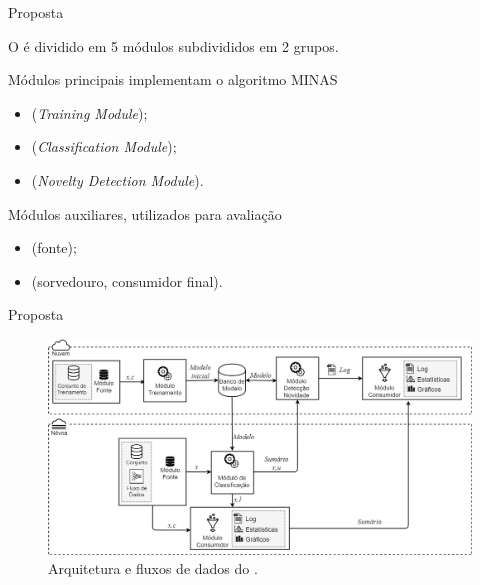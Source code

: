 \documentclass[aspectratio=43,10pt]{beamer}
\newcommand{\nota}[1]{\hspace*{-0.5cm}\textit{{\color[rgb]{1,0,0}Nota: #1}}}
\begin{document}
\begin{frame}[fragile]{Proposta}

  O \mfog é dividido em 5 módulos subdivididos em 2 grupos.
  
  \begin{alertblock}{Módulos principais implementam o algoritmo MINAS}
    \begin{itemize}
      \item \offline (\emph{Training Module});
      \item \classify (\emph{Classification Module});
      \item \detector (\emph{Novelty Detection Module}).
    \end{itemize}
  \end{alertblock}
  \begin{alertblock}{Módulos auxiliares, utilizados para avaliação}
    \begin{itemize}
      \item \source (fonte);
      \item \sink (sorvedouro, consumidor final).
    \end{itemize}
  \end{alertblock}
\end{frame}

\begin{frame}[fragile]{Proposta}
\vspace{-0.5cm}
\begin{figure}[h]
  \centering
  \hspace*{-0.9cm}
  \includegraphics[width=1.15\textwidth]{figuras/mfog-arch-v3_pt-br.png}
  \caption{Arquitetura e fluxos de dados do \mfog.}
  \label{fig:arch}
\end{figure}
\end{frame}
\end{document}
